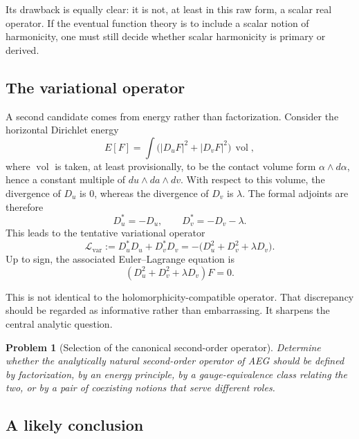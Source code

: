 \documentclass[11pt]{article}
\newtheorem{problem}{Problem}[section]
\newcommand{\AEG}{AEG}
\newcommand{\vol}{\operatorname{vol}}
\begin{document}
Its drawback is equally clear: it is not, at least in this raw form, a scalar real operator. If the eventual function theory is to include a scalar notion of harmonicity, one must still decide whether scalar harmonicity is primary or derived.

\subsection{The variational operator}

A second candidate comes from energy rather than factorization. Consider the horizontal Dirichlet energy
\begin{equation}
E[F] = \int \bigl(|D_uF|^2 + |D_vF|^2\bigr)\,\vol,
\end{equation}
where $\vol$ is taken, at least provisionally, to be the contact volume form $\alpha\wedge d\alpha$, hence a constant multiple of $du\wedge da\wedge dv$. With respect to this volume, the divergence of $D_u$ is $0$, whereas the divergence of $D_v$ is $\lambda$. The formal adjoints are therefore
\begin{equation}
D_u^* = -D_u,
\qquad
D_v^* = -D_v - \lambda.
\end{equation}
This leads to the tentative variational operator
\begin{equation}
\mathcal{L}_{\mathrm{var}} := D_u^*D_u + D_v^*D_v
= -\bigl(D_u^2 + D_v^2 + \lambda D_v\bigr).
\end{equation}
Up to sign, the associated Euler--Lagrange equation is
\begin{equation}
(D_u^2 + D_v^2 + \lambda D_v)F = 0.
\end{equation}

This is not identical to the holomorphicity-compatible operator. That discrepancy should be regarded as informative rather than embarrassing. It sharpens the central analytic question.

\begin{problem}[Selection of the canonical second-order operator]
Determine whether the analytically natural second-order operator of \AEG{} should be defined by factorization, by an energy principle, by a gauge-equivalence class relating the two, or by a pair of coexisting notions that serve different roles.
\end{problem}

\subsection{A likely conclusion}
\end{document}
